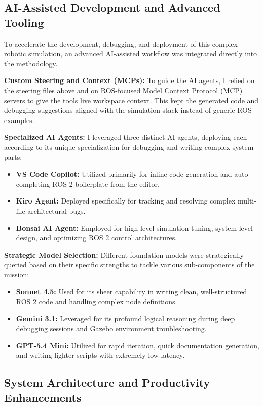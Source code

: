 \documentclass[12pt,a4paper]{article}
\begin{document}
\subsection{AI-Assisted Development and Advanced Tooling}

To accelerate the development, debugging, and deployment of this complex robotic simulation, an advanced AI-assisted workflow was integrated directly into the methodology. 

\textbf{Custom Steering and Context (MCPs):}
To guide the AI agents, I relied on the steering files above and on ROS-focused Model Context Protocol (MCP) servers to give the tools live workspace context. This kept the generated code and debugging suggestions aligned with the simulation stack instead of generic ROS examples.

\textbf{Specialized AI Agents:}
I leveraged three distinct AI agents, deploying each according to its unique specialization for debugging and writing complex system parts:
\begin{itemize}[leftmargin=*]
    \item \textbf{VS Code Copilot:} Utilized primarily for inline code generation and auto-completing ROS 2 boilerplate from the editor.
    \item \textbf{Kiro Agent:} Deployed specifically for tracking and resolving complex multi-file architectural bugs.
    \item \textbf{Bonsai AI Agent:} Employed for high-level simulation tuning, system-level design, and optimizing ROS 2 control architectures.
\end{itemize}

\textbf{Strategic Model Selection:}
Different foundation models were strategically queried based on their specific strengths to tackle various sub-components of the mission:
\begin{itemize}[leftmargin=*]
    \item \textbf{Sonnet 4.5:} Used for its sheer capability in writing clean, well-structured ROS 2 code and handling complex node definitions.
    \item \textbf{Gemini 3.1:} Leveraged for its profound logical reasoning during deep debugging sessions and Gazebo environment troubleshooting.
    \item \textbf{GPT-5.4 Mini:} Utilized for rapid iteration, quick documentation generation, and writing lighter scripts with extremely low latency.
\end{itemize}

\subsection{System Architecture and Productivity Enhancements}
\end{document}
